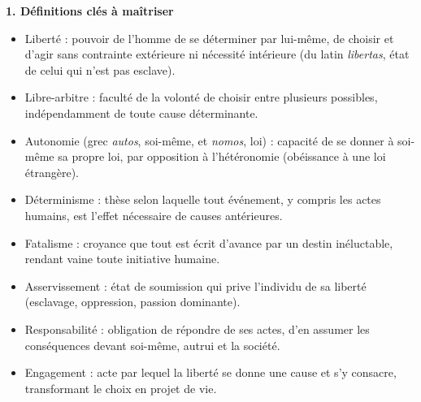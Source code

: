 \documentclass[11pt]{article}
\newcommand{\cle}[1]{{\popxbold\color{popdark}#1}}
\begin{document}
\begin{bilan}
\textbf{1. Définitions clés à maîtriser}
\begin{itemize}
  \item \cle{Liberté} : pouvoir de l'homme de se déterminer par lui-même, de choisir et d'agir sans contrainte extérieure ni nécessité intérieure (du latin \emph{libertas}, état de celui qui n'est pas esclave).
  \item \cle{Libre-arbitre} : faculté de la volonté de choisir entre plusieurs possibles, indépendamment de toute cause déterminante.
  \item \cle{Autonomie} (grec \emph{autos}, soi-même, et \emph{nomos}, loi) : capacité de se donner à soi-même sa propre loi, par opposition à l'\cle{hétéronomie} (obéissance à une loi étrangère).
  \item \cle{Déterminisme} : thèse selon laquelle tout événement, y compris les actes humains, est l'effet nécessaire de causes antérieures.
  \item \cle{Fatalisme} : croyance que tout est écrit d'avance par un destin inéluctable, rendant vaine toute initiative humaine.
  \item \cle{Asservissement} : état de soumission qui prive l'individu de sa liberté (esclavage, oppression, passion dominante).
  \item \cle{Responsabilité} : obligation de répondre de ses actes, d'en assumer les conséquences devant soi-même, autrui et la société.
  \item \cle{Engagement} : acte par lequel la liberté se donne une cause et s'y consacre, transformant le choix en projet de vie.
\end{itemize}


\end{bilan}
\end{document}
